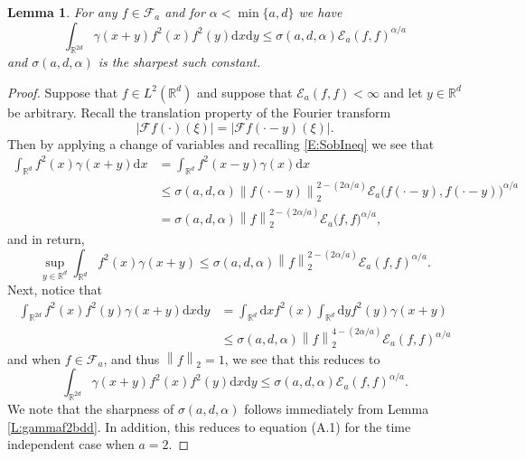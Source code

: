 \documentclass[a4paper,11pt]{article}
\numberwithin{equation}{section}
\numberwithin{equation}{section}
\theoremstyle{plain}
\newtheorem{lemma}[theorem]{Lemma}
\theoremstyle{definition}
\newcommand{\ud}{\ensuremath{\mathrm{d} }}
\newcommand{\Norm}[1]{\left\|  #1   \right\|}
\newcommand{\R}{\mathbb{R}}
\begin{document}
\begin{lemma} \label{L:gammaf2f2bdd}
  For any $f \in \mathcal{F}_a$ and for $\alpha < \min\{a,d\}$ we have
  \begin{equation} \label{E:sobineq1}
    \int_{\R^{2d}} \gamma(x+y)f^2(x)f^2(y) \ud x \ud y \le \sigma(a,d,\alpha) \mathcal{E}_a(f,f)^{\alpha/a}
  \end{equation}
  and $\sigma(a,d,\alpha)$ is the sharpest such constant.
\end{lemma}
\begin{proof}
  Suppose that $f \in L^2(\R^d)$ and suppose that $\mathcal{E}_a(f,f) < \infty$ and let $y\in \R^d$
  be arbitrary. Recall the translation property of the Fourier transform
  \[
    |\mathcal{F}f(\cdot)(\xi)|  = |\mathcal{F}f(\cdot-y)(\xi)|.
  \]
  Then by applying a change of variables and recalling \eqref{E:SobIneq} we see that
  \begin{align*}
    \int_{\R^d} f^2(x) \gamma(x+y)\ud x &= \int_{\R^d} f^2(x-y) \gamma(x)\ud x\\
    & \le \sigma(a,d,\alpha) \Norm{f(\cdot-y)}_2^{2-(2\alpha/a)}\mathcal{E}_a\big(f(\cdot-y),f(\cdot-y)\big)^{\alpha/a} \\
    & = \sigma(a,d,\alpha) \Norm{f}_2^{2-(2\alpha/a)}\mathcal{E}_a\big(f,f\big)^{\alpha/a}, 
  \end{align*}
  and in return,
  \[
    \sup_{y\in \R^d} \int_{\R^d} f^2(x) \gamma(x+y) \le \sigma(a,d,\alpha)     \Norm{f}_2^{2-(2\alpha/a)}\mathcal{E}_a(f,f)^{\alpha/a}.
  \]
  Next, notice that
  \begin{align*}
    \int_{\R^{2d}} f^2(x)f^2(y) \gamma(x+y) \ud x \ud y
    & = \int_{\R^d} \ud x f^2(x) \int_{\R^d} \ud y f^2(y)\gamma(x+y) \\
    & \le \sigma(a,d,\alpha) \Norm{f}_2^{4-(2\alpha/a)}\mathcal{E}_a(f,f)^{\alpha/a}
  \end{align*}
  and when $f \in \mathcal{F}_a$, and thus $\Norm{f}_2 = 1$, we see that this reduces to
  \[
    \int_{\R^{2d}} \gamma(x+y)f^2(x)f^2(y) \ud x \ud y \le \sigma(a,d,\alpha) \mathcal{E}_a(f,f)^{\alpha/a}.
  \]
  We note that the sharpness of $\sigma(a,d,\alpha)$ follows immediately from Lemma
  \ref{L:gammaf2bdd}. In addition, this reduces to equation (A.1) \cite{15AIHP} for the time
  independent case when $a=2$.
\end{proof}
\end{document}
